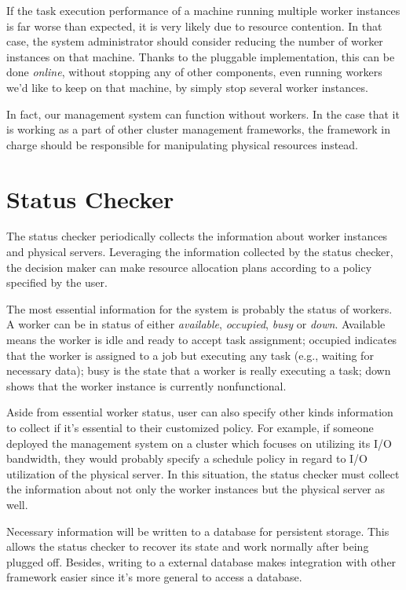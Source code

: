 If the task execution performance of a machine running multiple worker
instances is far worse than expected, it is very likely due to resource
contention.  In that case, the system administrator should consider
reducing the number of worker instances on that machine.  Thanks to the
pluggable implementation, this can be done \emph{online}, without
stopping any of other components, even running workers we'd like to keep
on that machine, by simply stop several worker instances.

In fact, our management system can function without workers.  In the
case that it is working as a part of other cluster management
frameworks, the framework in charge should be responsible for
manipulating physical resources instead.

\section{Status Checker}

The status checker periodically collects the information about worker
instances and physical servers.  Leveraging the information collected
by the status checker, the decision maker can make resource allocation
plans according to a policy specified by the user.

The most essential information for the system is probably the status of
workers.  A worker can be in status of either \emph{available},
\emph{occupied}, \emph{busy} or \emph{down}.  Available means the worker
is idle and ready to accept task assignment; occupied indicates that the
worker is assigned to a job but executing any task (e.g., waiting for
necessary data); busy is the state that a worker is really executing a
task; down shows that the worker instance is currently nonfunctional. 

Aside from essential worker status, user can also specify other kinds
information to collect if it's essential to  their customized policy.
For example, if someone deployed the management system on a cluster
which focuses on utilizing its I/O bandwidth, they would probably
specify a schedule policy in regard to I/O utilization of the
physical server.  In this situation, the status checker must collect the
information about not only the worker instances but the physical server
as well.

Necessary information will be written to a database for persistent
storage.  This allows the status checker to recover its state and work
normally after being plugged off.  Besides, writing to a external
database makes integration with other framework easier since it's more
general to access a database.

